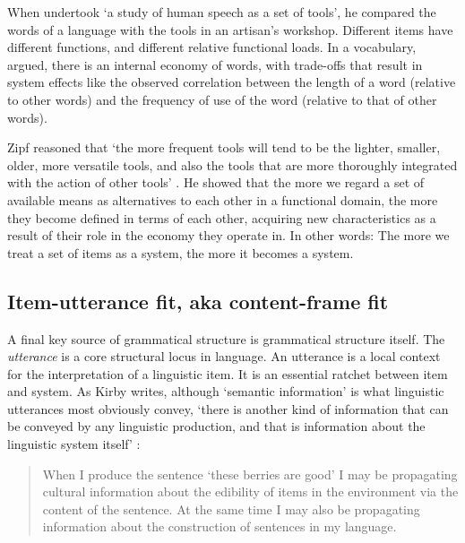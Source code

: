 When \citet{zipf_human_1949} undertook \textquoteleft a study of human speech as a set of 
tools', he compared the words of a language with the tools in an 
artisan's workshop. Different items have different functions, and different relative functional loads. In a vocabulary, \citet[21]{zipf_human_1949} 
argued, there is an internal economy of words, with trade-offs 
that result in system effects like the observed correlation between 
the length of a word (relative to other words) and the frequency of use 
of the word (relative to that of other words). 



Zipf reasoned that \textquoteleft the more frequent tools will tend to be the lighter, 
smaller, older, more versatile tools, and also the tools that are more 
thoroughly integrated with the action of other tools' \citep[73]{zipf_human_1949}. He 
showed that the more we regard a set of available means as alternatives 
to each other in a functional domain, the more they become defined in 
terms of each other, acquiring new characteristics as a result of their 
role in the economy they operate in. In other words: The more we 
treat a set of items as a system, the more it becomes a system.



\subsection{Item-utterance fit, aka content-frame fit}
\label{itemutterance}

A final key source of grammatical structure is grammatical 
structure itself. The \textit{utterance }is a core structural locus in 
language. An utterance is a local context for the interpretation of a 
linguistic item. It is an essential ratchet between item 
and system. As Kirby writes, although \textquoteleft semantic information' is what 
linguistic utterances most obviously convey, \textquoteleft there is another kind of 
information that can be conveyed by any linguistic production, and that 
is information about the linguistic system itself' \citep[123]{kirby_transitions:_2013}: 

\begin{quotation}
When I produce the sentence \textquoteleft these berries are good' I may 
be propagating cultural information about the edibility of items in the 
environment via the content of the sentence. At the same time I may also 
be propagating information about the construction of sentences in my 
language.
\end{quotation}

